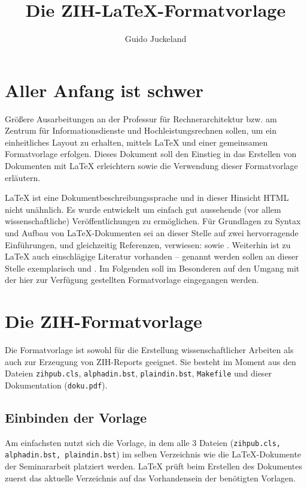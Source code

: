 \documentclass[plainarticle,zihtitle,german,final,hyperref,utf8]{zihpub}
\author{Guido Juckeland}
\title{Die ZIH-\LaTeX-Formatvorlage}
\begin{document}
\section{Aller Anfang ist schwer}
Gr\"o{\ss}ere Ausarbeitungen an der Professur f\"ur Rechnerarchitektur bzw. am Zentrum f\"ur Informationsdienste und Hochleistungsrechnen sollen, um ein einheitliches Layout zu erhalten, mittels {\LaTeX} und einer gemeinsamen Formatvorlage erfolgen. 
Dieses Dokument soll den Einstieg in das Erstellen von Dokumenten mit {\LaTeX} erleichtern sowie die Verwendung dieser Formatvorlage erl\"autern.

{\LaTeX} ist eine Dokumentbeschreibungssprache und in dieser Hinsicht HTML nicht un\"ahnlich. 
Es wurde entwickelt um einfach gut aussehende (vor allem wissenschaftliche) Ver\"offentlichungen zu erm\"oglichen. 
F\"ur Grundlagen zu Syntax und Aufbau von {\LaTeX}-Dokumenten sei an dieser Stelle auf zwei hervorragende Einf\"uhrungen, und gleichzeitig Referenzen, verwiesen: \cite{kochbuch} sowie \cite{rudl}. 
Weiterhin ist zu {\LaTeX} auch einschl\"agige Literatur vorhanden -- genannt werden sollen an dieser Stelle exemplarisch \cite{begleiter} und \cite{kopka}. 
Im Folgenden soll im Besonderen auf den Umgang mit der hier zur Verf\"ugung gestellten Formatvorlage eingegangen werden.

\section{Die ZIH-Formatvorlage}
Die Formatvorlage ist sowohl f\"ur die Erstellung wissenschaftlicher Arbeiten als auch zur Erzeugung von ZIH-Reports geeignet. 
Sie besteht im Moment aus den Dateien \texttt{zihpub.cls}, \texttt{alphadin.bst}, \texttt{plaindin.bst}, \texttt{Makefile} und dieser Dokumentation (\texttt{doku.pdf}).


\subsection{Einbinden der Vorlage}
Am einfachsten nutzt sich die Vorlage, in dem alle 3 Dateien (\texttt{zihpub.cls, alphadin.bst, plaindin.bst}) im selben Verzeichnis wie die {\LaTeX}-Dokumente der Seminararbeit platziert werden. 
{\LaTeX} pr\"uft beim Erstellen des Dokumentes zuerst das aktuelle Verzeichnis auf das Vorhandensein der ben\"otigten Vorlagen.
\end{document}
